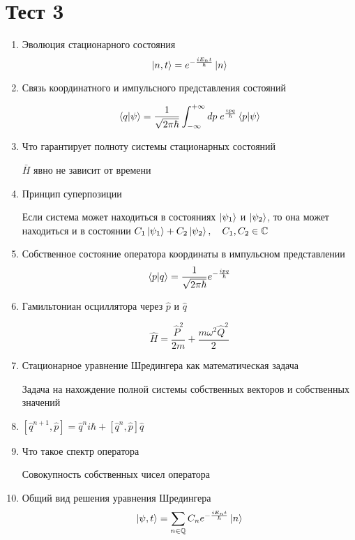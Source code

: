 \section*{Тест 3}
\begin{enumerate}
    \item Эволюция стационарного состояния
        $$\ket{n,t}=e^{-\frac{i E_n t}{\hbar}}\ket{n}$$
    \item Связь координатного и импульсного представления состояний
        
$$\braket{q|\psi}=\frac{1}{\sqrt{2\pi\hbar}}\int^{+\infty}_{-\infty}dp\; e^\frac{ipq}{\hbar}\braket{p|\psi}$$
    \item Что гарантирует полноту системы стационарных состояний

        $\bar H$ явно не зависит от времени
    \item Принцип суперпозиции

        Если система может находиться в состояниях $\ket{\psi_1}$ и $\ket{\psi_2}$,
        то она может находиться и в состоянии $C_1\ket{\psi_1}+C_2\ket{\psi_2},\quad C_1,C_2\in \mathbb C$
    \item Собственное состояние оператора координаты в импульсном представлении
        $$\braket{p|q}=\frac{1}{\sqrt{2\pi\hbar}}e^{-\frac{ipq}{\hbar}}$$
    \item Гамильтониан осциллятора через $\hat p$ и $\hat q$

        $$\hat H=\frac{{\hat P}^2}{2m}+\frac{m\omega^2\hat Q^2}{2}$$
    \item Стационарное уравнение Шредингера как математическая задача

        Задача на нахождение полной системы собственных векторов и собственных значений
    \item $[\hat q^{n+1},\hat p]={\hat q}^ni\hbar + [\hat q^n,\hat p]\hat q$
    \item Что такое спектр оператора

        Совокупность собственных чисел оператора
    \item Общий вид решения уравнения Шредингера
        $$\ket{\psi,t}=\sum_{n\in\mathbb Q} C_n e^{-\frac{iE_n t}{\hbar}}\ket{n}$$
\end{enumerate}
